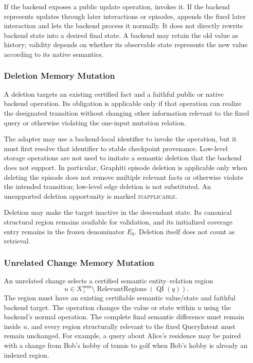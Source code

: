 If the backend exposes a public update operation, \system invokes it. If the
backend represents updates through later interactions or episodes, \system
appends the fixed later interaction and lets the backend process it normally.
It does not directly rewrite backend state into a desired final state. A
backend may retain the old value as history; validity depends on whether its
observable state represents the new value according to its native semantics.

\subsubsection{Deletion Memory Mutation}

A deletion targets an existing certified fact and a faithful public or native
backend operation. Its obligation is applicable only if that operation can
realize the designated transition without changing other information relevant
to the fixed query or otherwise violating the one-input mutation relation.

The adapter may use a backend-local identifier to invoke the operation, but it
must first resolve that identifier to stable checkpoint provenance. Low-level
storage operations are not used to imitate a semantic deletion that the
backend does not support. In particular, Graphiti episode deletion is
applicable only when deleting the episode does not remove multiple relevant
facts or otherwise violate the intended transition; low-level edge deletion is
not substituted. An unsupported deletion opportunity is marked
\textsc{inapplicable}.

Deletion may make the target inactive in the descendant state. Its canonical
structural region remains available for validation, and its initialized
coverage entry remains in the frozen denominator \(E_0\). Deletion itself does
not count as retrieval.

\subsubsection{Unrelated Change Memory Mutation}

An unrelated change selects a certified semantic entity--relation region
\[
u\in \mathcal{K}^{\mathrm{sem}}_i\setminus
\operatorname{RelevantRegions}(\operatorname{QI}(q)).
\]
The region must have an existing certifiable semantic value/state and faithful
backend target. The operation changes the value or state within \(u\) using
the backend's normal operation. The complete final semantic difference must
remain inside \(u\), and every region structurally relevant to the fixed
QueryIntent must remain unchanged. For example, a query about Alice's
residence may be paired with a change from Bob's hobby of tennis to golf when
Bob's hobby is already an indexed region.


